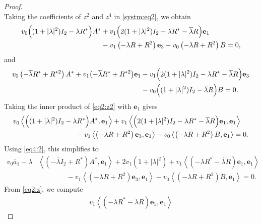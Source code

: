 \documentclass[12pt, reqno]{amsart}
\theoremstyle{definition}
\theoremstyle{remark}
\numberwithin{equation}{section}
\begin{document}
\begin{proof}
\begin{equation}
	\end{equation} 
	Taking the coefficients of $z^2$ and $z^4$ in \eqref{systm:eq2}, we obtain
	\begin{align}
		v_0 \Bigl( (1+|\lambda|^2)I_2 - \lambda R^* \Bigr)  A^* & + v_1 \Bigl( 2(1+|\lambda|^2)I_2 - \lambda R^* - \overline{\lambda}R \Bigr)  \mathbf{e}_1 \nonumber \\ 
		& - v_1 \left(  -\lambda R + R^2 \right)  \mathbf{e}_3 - v_0 \left(  -\lambda R + R^2 \right)    B = 0, \label{eq2:z2}
	\end{align}
	and
	\begin{align}
		v_0 \left(  -\overline{\lambda} R^* + R^{*2} \right)   A^*  + v_1 \bigl( -\overline{\lambda} R^* + R^{*2} \bigr)  \mathbf{e}_1& - v_1  \Bigl( 2(1+|\lambda|^2)I_2 - \lambda R^* - \overline{\lambda}R \Bigr)  \mathbf{e}_3 \nonumber \\
		& - v_0  \Bigl((1+|\lambda|^2)I_2 - \overline{\lambda} R \Bigr)  B = 0. \label{eq2:z4}
	\end{align}
	Taking the inner product of \eqref{eq2:z2} with $\mathbf{e}_1$ gives
	\begin{align}
		v_0 & \left\langle \Bigl( (1+|\lambda|^2)I_2 - \lambda R^* \Bigr)  A^*, \mathbf{e}_1 \right\rangle + v_1 \left\langle \Bigl( 2(1+|\lambda|^2)I_2 - \lambda R^* - \overline{\lambda}R \Bigr)  \mathbf{e}_1, \mathbf{e}_1 \right\rangle \nonumber \\ 
		&\qquad \qquad \qquad \qquad - v_1 \left\langle\left(  -\lambda R + R^2 \right) \mathbf{e}_3, \mathbf{e}_1 \right\rangle - v_0 \left\langle \left(  -\lambda R + R^2 \right) B, \mathbf{e}_1 \right\rangle = 0. \label{eq2:z2x100}
	\end{align}
	Using \eqref{eq4:2}, this simplifies to
	\begin{align}
		v_0 \overline{a}_1  - \lambda &\left\langle \left(  -\overline{\lambda}I_2 + R^* \right)  A^*, \mathbf{e}_1 \right\rangle + 2v_1(1+|\lambda|^2) + v_1 \left\langle \left(  -\lambda R^* - \overline{\lambda}R \right)  \mathbf{e}_1, \mathbf{e}_1 \right\rangle \nonumber \\ 
		&  \qquad \qquad -v_1 \left\langle \left(  -\lambda R + R^2 \right)  \mathbf{e}_3, \mathbf{e}_1 \right\rangle - v_0 \left\langle \left(  -\lambda R + R^2 \right)  B, \mathbf{e}_1 \right\rangle = 0. \label{eq2:z2x1002}
	\end{align}
	From \eqref{eq2:z}, we compute
	\begin{align}
		v_1 \left\langle \left(  -\lambda R^* - \overline{\lambda}R \right)  \mathbf{e}_1, \mathbf{e}_1 \right\rangle 

\end{align}
\end{proof}
\end{document}
